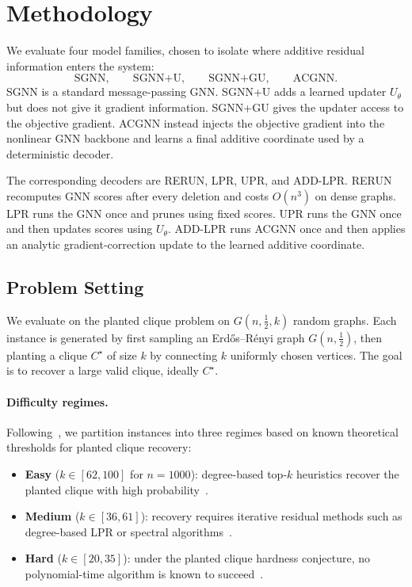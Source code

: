 \documentclass[11pt]{article}
\theoremstyle{plain}
\theoremstyle{definition}
\theoremstyle{remark}
\begin{document}
\section{Methodology}
\label{sec:method}

We evaluate four model families, chosen to isolate where additive residual
information enters the system:
\[
  \text{SGNN},\qquad
  \text{SGNN+U},\qquad
  \text{SGNN+GU},\qquad
  \text{ACGNN}.
\]
SGNN is a standard message-passing GNN. SGNN+U adds a learned updater $U_\theta$ but
does not give it gradient information. SGNN+GU gives the updater access to the
objective gradient. ACGNN instead injects the objective gradient into the nonlinear
GNN backbone and learns a final additive coordinate used by a deterministic decoder.

The corresponding decoders are RERUN, LPR, UPR, and ADD-LPR. RERUN recomputes GNN
scores after every deletion and costs $O(n^3)$ on dense graphs. LPR runs the GNN once
and prunes using fixed scores. UPR runs the GNN once and then updates scores using
$U_\theta$. ADD-LPR runs ACGNN once and then applies an analytic gradient-correction
update to the learned additive coordinate.

\subsection{Problem Setting}
\label{sec:problem}

We evaluate on the planted clique problem on $G(n,\tfrac{1}{2},k)$ random graphs.
Each instance is generated by first sampling an Erd\H{o}s--R\'enyi graph
$G(n,\tfrac{1}{2})$, then planting a clique $C^\star$ of size $k$ by connecting $k$
uniformly chosen vertices. The goal is to recover a large valid clique, ideally
$C^\star$.

\paragraph{Difficulty regimes.}
Following~\citet{shoham2026ltr}, we partition instances into three regimes based on
known theoretical thresholds for planted clique recovery:
\begin{itemize}
  \item \textbf{Easy} ($k \in [62, 100]$ for $n=1000$): degree-based top-$k$
    heuristics recover the planted clique with high probability~\citep{kucera1995}.
  \item \textbf{Medium} ($k \in [36, 61]$): recovery requires iterative residual
    methods such as degree-based LPR or spectral
    algorithms~\citep{alon1998, feige2010}.
  \item \textbf{Hard} ($k \in [20, 35]$): under the planted clique hardness
    conjecture, no polynomial-time algorithm is known to
    succeed~\citep{manurangsi2021}.
\end{itemize}
\end{document}
